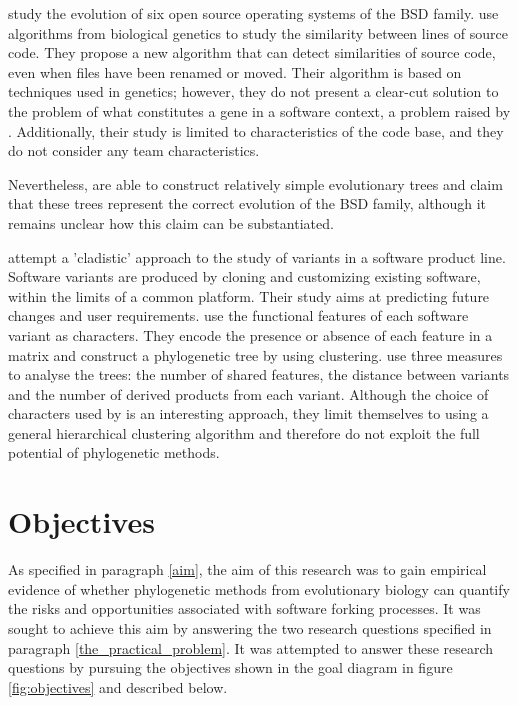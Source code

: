 \citet{Tenev2012a} study the evolution of six open source operating systems of the BSD family. \citet{Tenev2012a} use algorithms from biological genetics to study the similarity between lines of source code. They propose a new algorithm that can detect similarities of source code, even when files have been renamed or moved. Their algorithm is based on techniques used in genetics; however, they do not present a clear-cut solution to the problem of what constitutes a gene in a software context, a problem raised by \citet{Nehaniv2006a}. Additionally, their study is limited to characteristics of the code base, and they do not consider any team characteristics.

Nevertheless, \citet{Tenev2012a} are able to construct relatively simple evolutionary trees and claim that these trees represent the correct evolution of the BSD family, although it remains unclear how this claim can be substantiated.

\citet{Benlarabi2015b} attempt a 'cladistic' approach to the study of variants in a software product line. Software variants are produced by cloning and customizing existing software, within the limits of a common platform. Their study aims at predicting future changes and user requirements. \citet{Benlarabi2015b} use the functional features of each software variant as characters. They encode the presence or absence of each feature in a matrix and construct a phylogenetic tree by using clustering. \citet{Benlarabi2015b} use three measures to analyse the trees: the number of shared features, the distance between variants and the number of derived products from each variant. Although the choice of characters used by \citet{Benlarabi2015b} is an interesting approach, they limit themselves to using a general hierarchical clustering algorithm and therefore do not exploit the full potential of phylogenetic methods.


\section{Objectives}

As specified in paragraph \ref{aim}, the aim of this research was to gain empirical evidence of whether phylogenetic methods from evolutionary biology can quantify the risks and opportunities associated with software forking processes. It was sought to achieve this aim by answering the two research questions specified in paragraph \ref{the_practical_problem}. It was attempted to answer these research questions by pursuing the objectives shown in the goal diagram in figure \ref{fig:objectives} and described below.

